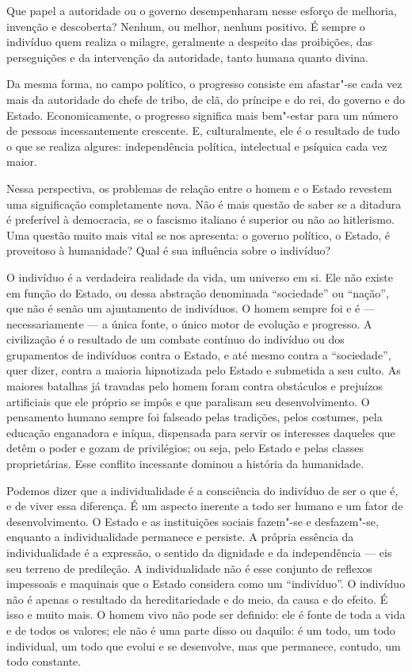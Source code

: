 Que papel a autoridade ou o governo desempenharam nesse esforço de
melhoria, invenção e descoberta? Nenhum, ou melhor, nenhum positivo. É
sempre o indivíduo quem realiza o milagre, geralmente a despeito das
proibições, das perseguições e da intervenção da autoridade, tanto
humana quanto divina.

Da mesma forma, no campo político, o progresso consiste em afastar"-se
cada vez mais da autoridade do chefe de tribo, de clã, do príncipe e do
rei, do governo e do Estado. Economicamente, o progresso significa mais
bem"-estar para um número de pessoas incessantemente crescente. E,
culturalmente, ele é o resultado de tudo o que se realiza algures:
independência política, intelectual e psíquica cada vez maior.

Nessa perspectiva, os problemas de relação entre o homem e o Estado
revestem uma significação completamente nova. Não é mais questão de
saber se a ditadura é preferível à democracia, se o fascismo italiano é
superior ou não ao hitlerismo. Uma questão muito mais vital se nos
apresenta: o governo político, o Estado, é proveitoso à humanidade?
Qual é sua influência sobre o indivíduo?

O indivíduo é a verdadeira realidade da vida, um universo em si. Ele não
existe em função do Estado, ou dessa abstração denominada “sociedade”
ou “nação”, que não é senão um ajuntamento de indivíduos. O homem
sempre foi e é --- necessariamente --- a única fonte, o único motor de
evolução e progresso. A civilização é o resultado de um combate
contínuo do indivíduo ou dos grupamentos de indivíduos contra o Estado,
e até mesmo contra a “sociedade”, quer dizer, contra a maioria
hipnotizada pelo Estado e submetida a seu culto. As maiores batalhas já
travadas pelo homem foram contra obstáculos e prejuízos artificiais
que ele próprio se impôs e que paralisam seu desenvolvimento. O
pensamento humano sempre foi falseado pelas tradições, pelos costumes,
pela educação enganadora e iníqua, dispensada para servir os interesses
daqueles que detêm o poder e gozam de privilégios; ou seja, pelo Estado
e pelas classes proprietárias. Esse conflito incessante dominou a
história da humanidade.

Podemos dizer que a individualidade é a consciência do indivíduo de ser
o que é, e de viver essa diferença. É um aspecto inerente a todo ser
humano e um fator de desenvolvimento. O Estado e as instituições
sociais fazem"-se e desfazem"-se, enquanto a individualidade
permanece e persiste. A própria essência da individualidade é a
expressão, o sentido da dignidade e da independência --- eis seu terreno
de predileção. A individualidade não é esse conjunto de reflexos
impessoais e maquinais que o Estado considera como um “indivíduo”. O
indivíduo não é apenas o resultado da hereditariedade e do meio, da
causa e do efeito. É isso e muito mais. O homem vivo não pode ser
definido: ele é fonte de toda a vida e de todos os valores; ele não é
uma parte disso ou daquilo: é um todo, um todo individual, um todo que
evolui e se desenvolve, mas que permanece, contudo, um todo constante.

